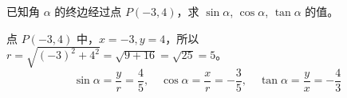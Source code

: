 \begin{example}
    已知角 $\alpha$ 的终边经过点 $P(-3, 4)$，求 $\sin\alpha$, $\cos\alpha$, $\tan\alpha$ 的值。
\end{example}

\begin{solution}
    点 $P(-3, 4)$ 中，$x=-3, y=4$，所以 $r = \sqrt{(-3)^2 + 4^2} = \sqrt{9+16} = \sqrt{25} = 5$。
    $$\sin\alpha = \frac{y}{r} = \frac{4}{5}, \quad \cos\alpha = \frac{x}{r} = -\frac{3}{5}, \quad \tan\alpha = \frac{y}{x} = -\frac{4}{3}$$
\end{solution}

\vspace{2em}
